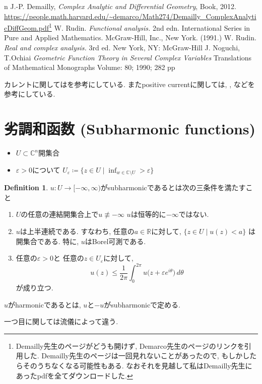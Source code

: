 \documentclass[dvipdfmx,a4paper,11pt]{report} %
\theoremstyle{definition}
\newtheorem{defn}[thm]{Definition}
\theoremstyle{remark}
\numberwithin{equation}{section}
\newcommand{\R}{\mathbb{R}}
\newcommand{\C}{\mathbb{C}}
\begin{document}
\begin{thebibliography}{n}
J.-P. Demailly,
\textit{Complex Analytic and Differential Geometry},
Book, 2012.
\url{https://people.math.harvard.edu/~demarco/Math274/Demailly_ComplexAnalyticDiffGeom.pdf}\footnote{Demailly先生のページがどうも開けず, Demarco先生のページのリンクを引用した. Demailly先生のページは一回見れないことがあったので, もしかしたらそのうちなくなる可能性もある. なおそれを見越して私はDemailly先生にあったpdfを全てダウンロードした.}
W. Rudin. \textit{Functional analysis.} 2nd edn. International Series in Pure and Applied Mathematics. McGraw-Hill, Inc., New York. (1991.)
W. Rudin. \textit{Real and complex analysis. } 3rd ed. New York, NY: McGraw-Hill 
J. Noguchi, T.Ochiai \textit{Geometric Function Theory in Several Complex Variables} Translations of Mathematical Monographs
Volume: 80; 1990; 282 pp
\end{thebibliography}
 
カレントに関しては\cite[Chapter 3]{NO}を参考にしている. 
またpositive currentに関しては, 
\cite[Chapter 1. Section 3.C]{Dem}, \cite[Chapter 3. Section 1.]{Dem}
などを参考にしている. 

\section{劣調和函数 (Subharmonic functions)}

\begin{itemize}
\item $U \subset \C^n $開集合
\item $\varepsilon >0$について
$
U_\varepsilon \coloneqq
\{ z \in U \mid\inf_{w \in \C \setminus U} > \varepsilon\}
$
\end{itemize}


\begin{tcolorbox}[mybox]
\begin{defn}
$u : U \to [- \infty, \infty)$がsubharmonicであるとは次の三条件を満たすこと
\begin{enumerate}
\item $U$の任意の連結開集合上で$u \not \equiv - \infty$ 
$u$は恒等的に$-\infty$ではない.

\item
$u$は上半連続である.
すなわち, 任意の$a \in \R$に対して,
\(
\{z \in U \mid u(z) < a\}
\)
は開集合である.
特に, $u$はBorel可測である.

\item
任意の$\varepsilon > 0$と
任意の$z \in U_\varepsilon$に対して,
\[
u(z)
\leq
\frac{1}{2\pi}
\int_0^{2\pi}
u\bigl(z+\varepsilon e^{i\theta}\bigr)\,d\theta
\]
が成り立つ.
\end{enumerate}
$u$がharmonicであるとは, $u$と$-u$がsubharmonicで定める. 
\end{defn}
\end{tcolorbox}
一つ目に関しては流儀によって違う. 
\end{document}
